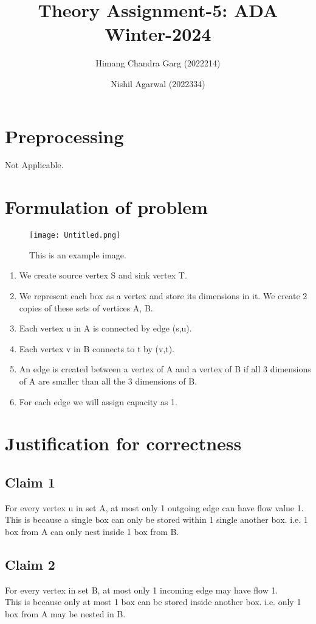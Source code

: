 \documentclass{article}
\title{Theory Assignment-5: ADA Winter-2024}
\author{Himang Chandra Garg (2022214) \and Nishil Agarwal (2022334)}
\date{}
\begin{document}
\maketitle
\vspace{2cm}
\section{Preprocessing}
Not Applicable.
\\
\section{Formulation of problem}
\vspace{0.5cm}
\begin{figure}[h]
    \centering    
    \texttt{[image: Untitled.png]}
    \caption{This is an example image.}
    \label{fig:example}
\end{figure}
\vspace{0.5cm}
\begin{enumerate}
    \item We create source vertex S and sink vertex T. 
    \item We represent each box as a vertex and store its dimensions in it. We create 2 copies of these sets of vertices A, B. 
    \item Each vertex u in A is connected by edge (s,u). 
    \item Each vertex v in B connects to t by (v,t).
    \item An edge is created between a vertex of A and a vertex of B if all 3 dimensions of A are smaller than all the 3 dimensions of B.
    \item For each edge we will assign capacity as 1.
    \\
\end{enumerate}
\section{Justification for correctness}
\subsection{Claim 1}
For every vertex u in set A, at most only 1 outgoing edge can have flow value 1.\\
This is because a single box can only be stored within 1 single another box. i.e. 1 box from A can only nest inside 1 box from B.
\subsection{Claim 2}
For every vertex in set B, at most only 1 incoming edge may have flow 1.\\
This is because only at most 1 box can be stored inside another box. i.e. only 1 box from A may be nested in B.
\end{document}
